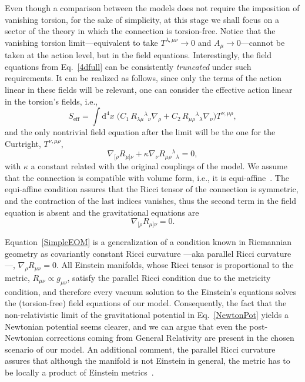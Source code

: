 \documentclass[aps,prd,12pt,twocolumn,superscriptaddress,showpacs,showkeys,reprint%
]{revtex4-1}
\newcommand\nab[1]{\nabla_{{#1}}}
\renewcommand{\(}{\left(}
\renewcommand{\)}{\right)}
\renewcommand{\[}{\left[}
\renewcommand{\]}{\right]}
\newcommand{\dn}[2]{{\mathrm{d}}^{#1}{#2}\;}
\newcommand{\hl}[1]{{\color{red} \bfseries{#1}}}
\begin{document}
Even though a comparison between the models does not require the imposition of vanishing torsion, for the sake of simplicity, at this stage we shall focus on a sector of the theory in which the connection is torsion-free. Notice that the vanishing torsion limit---equivalent to take $T^{\lambda,\mu\nu} \to 0$ and $A_\mu \to 0$---cannot be taken at the action level, but in the field equations. Interestingly, the field equations from Eq.~\eqref{4dfull} can be consistently \emph{truncated} under such requirements. It can be realized as follows, since only the terms of the action linear in these fields will be relevant, one can consider the effective action linear in the torsion's fields, i.e.,
\begin{equation}
  \label{eff-action}
  S_{\text{eff}} = \int\dn{4}{x} \Big( C_1\, R_{\lambda\mu}{}^{\lambda}{}_\nu \nabla_\rho %
  + C_2 \, R_{\mu\rho}{}^{\lambda}{}_\lambda \nabla_\nu \Big) T^{\nu,\mu\rho} ,
\end{equation}
and the only nontrivial field equation after the limit will be the one for the Curtright, $T^{\nu,\mu\rho}$,
\begin{equation}
  \nab{[\rho} R_{\mu]\nu} + \kappa \nab{\nu} R_{\mu\rho}{}^\lambda{}_\lambda = 0,
  \label{almostSimpleEOM}
\end{equation}
with $\kappa$ a constant related with the original couplings of the model. We assume that the connection is compatible with volume form, i.e., it is equi-affine~\cite{nomizu1994affine,MO-Bryant02}.  The equi-affine condition assures that the Ricci tensor of the connection is symmetric, and the contraction of the last indices vanishes, thus the second term in the field equation is absent and the gravitational equations are
\begin{equation}
  \nab{[\rho} R_{\mu]\nu} = 0.
  \label{SimpleEOM}
\end{equation}

Equation~\eqref{SimpleEOM} is a generalization of a condition known in Riemannian geometry as covariantly constant Ricci curvature ---aka parallel Ricci curvature---, \mbox{$\nab{\rho} R_{\mu\nu} = 0$.}  All Einstein manifolds, whose Ricci tensor is proportional to the metric, \mbox{$R_{\mu\nu} \propto g_{\mu\nu}$,} satisfy the parallel Ricci condition due to the metricity condition, and therefore every vacuum solution to the Einstein's equations solves the (torsion-free) field equations of our model. Consequently, the fact that the non-relativistic limit of the gravitational potential in Eq.~\eqref{NewtonPot} yields a Newtonian potential seems clearer, and we can argue that even the post-Newtonian corrections coming from General Relativity are present in the chosen scenario of our model. An additional comment, the parallel Ricci curvature assures that although the manifold is not Einstein in general, the metric has to be locally a product of Einstein metrics~\cite{Besse}.
\end{document}
